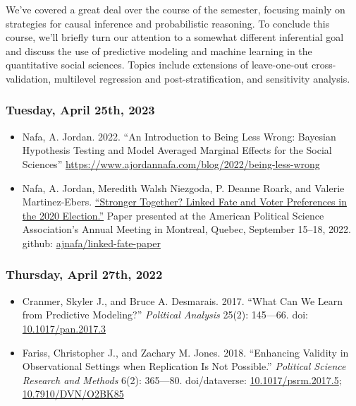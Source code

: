 \documentclass[12pt,]{article}
\begin{document}
\noindent We've covered a great deal over the course of the semester,
focusing mainly on strategies for causal inference and probabilistic
reasoning. To conclude this course, we'll briefly turn our attention to
a somewhat different inferential goal and discuss the use of predictive
modeling and machine learning in the quantitative social sciences.
Topics include extensions of leave-one-out cross-validation, multilevel
regression and post-stratification, and sensitivity analysis.

\hypertarget{tuesday-april-25th-2023}{%
\subsubsection{Tuesday, April 25th,
2023}\label{tuesday-april-25th-2023}}

\begin{itemize}
\item
  Nafa, A. Jordan. 2022. ``An Introduction to Being Less Wrong: Bayesian
  Hypothesis Testing and Model Averaged Marginal Effects for the Social
  Sciences''
  \url{https://www.ajordannafa.com/blog/2022/being-less-wrong}
\item
  Nafa, A. Jordan, Meredith Walsh Niezgoda, P. Deanne Roark, and Valerie
  Martinez-Ebers.
  \href{https://github.com/ajnafa/linked-fate-paper/raw/main/manuscript/latex/Stronger-Together-Draft-TeX.pdf}{``Stronger
  Together? Linked Fate and Voter Preferences in the 2020 Election.''}
  Paper presented at the American Political Science Association's Annual
  Meeting in Montreal, Quebec, September 15--18, 2022. github:
  \href{https://github.com/ajnafa/linked-fate-paper}{ajnafa/linked-fate-paper}
\end{itemize}

\hypertarget{thursday-april-27th-2022}{%
\subsubsection{Thursday, April 27th,
2022}\label{thursday-april-27th-2022}}

\begin{itemize}
\item
  Cranmer, Skyler J., and Bruce A. Desmarais. 2017. ``What Can We Learn
  from Predictive Modeling?'' \emph{Political Analysis} 25(2): 145---66.
  doi: \href{https://doi.org/10.1017/pan.2017.3}{10.1017/pan.2017.3}
\item
  Fariss, Christopher J., and Zachary M. Jones. 2018. ``Enhancing
  Validity in Observational Settings when Replication Is Not Possible.''
  \emph{Political Science Research and Methods} 6(2): 365---80.
  doi/dataverse:
  \href{https://doi.org/10.1017/psrm.2017.5}{10.1017/psrm.2017.5};
  \href{http://dx.doi.org/10.7910/DVN/O2BK85}{10.7910/DVN/O2BK85}
\end{itemize}
\end{document}
